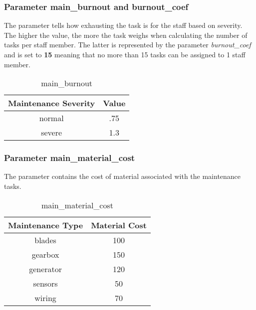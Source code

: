         \subsubsection{Parameter main\_burnout and burnout\_coef}
        The parameter tells how exhausting the task is for the staff based on severity. The higher 
        the value, the more the task weighs when calculating the number of tasks per staff member.
        The latter is represented by the parameter \textit{burnout\_coef} and is set to \textbf{15} 
        meaning that no more than 15 tasks can be assigned to 1 staff member.
        \begin{table}[H]
            \begin{center}
                \begin{tabular}{ |c|c| } 
                \hline
                Maintenance Severity & Value \\
                \hline
                normal   & .75 \\ 
                severe   & 1.3 \\ 
                \hline
                \end{tabular}
            \end{center}
        \caption{main\_burnout} %
        \label{param_main_burnout} %
        \end{table}

        \subsubsection{Parameter main\_material\_cost}
        The parameter contains the cost of material associated with the maintenance tasks.
        \begin{table}[H]
            \begin{center}
                \begin{tabular}{ |c|c| } 
                \hline
                Maintenance Type & Material Cost \\ 
                \hline
                blades    & 100 \\ 
                gearbox   & 150 \\ 
                generator & 120 \\ 
                sensors   & 50  \\ 
                wiring    & 70  \\ 
                \hline
                \end{tabular}
            \end{center}
        \caption{main\_material\_cost} %
        \label{param_main_material_cost} %
        \end{table}

